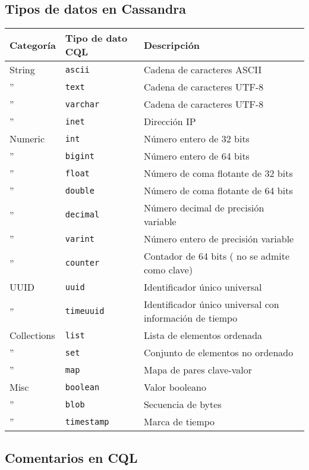 \documentclass[
]{book}
\begin{document}
\subsection{Tipos de datos en Cassandra}\label{tipos-de-datos-en-cassandra}

\begin{longtable}[]{@{}lll@{}}
\toprule\noalign{}
Categoría & Tipo de dato CQL & Descripción \\
\midrule\noalign{}
\endhead
\bottomrule\noalign{}
\endlastfoot
String & \texttt{ascii} & Cadena de caracteres ASCII \\
'' & \texttt{text} & Cadena de caracteres UTF-8 \\
'' & \texttt{varchar} & Cadena de caracteres UTF-8 \\
'' & \texttt{inet} & Dirección IP \\
Numeric & \texttt{int} & Número entero de 32 bits \\
'' & \texttt{bigint} & Número entero de 64 bits \\
'' & \texttt{float} & Número de coma flotante de 32 bits \\
'' & \texttt{double} & Número de coma flotante de 64 bits \\
'' & \texttt{decimal} & Número decimal de precisión variable \\
'' & \texttt{varint} & Número entero de precisión variable \\
'' & \texttt{counter} & Contador de 64 bits ( no se admite como clave) \\
UUID & \texttt{uuid} & Identificador único universal \\
'' & \texttt{timeuuid} & Identificador único universal con información de tiempo \\
Collections & \texttt{list} & Lista de elementos ordenada \\
'' & \texttt{set} & Conjunto de elementos no ordenado \\
'' & \texttt{map} & Mapa de pares clave-valor \\
Misc & \texttt{boolean} & Valor booleano \\
'' & \texttt{blob} & Secuencia de bytes \\
'' & \texttt{timestamp} & Marca de tiempo \\
\end{longtable}

\subsection{Comentarios en CQL}\label{comentarios-en-cql}
\end{document}
